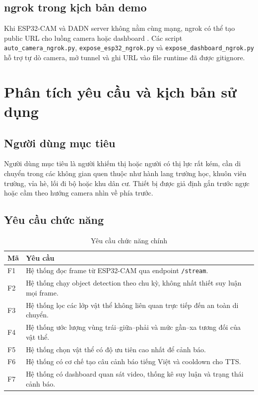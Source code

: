 \documentclass[oneside,final]{hcmut-report}
\begin{document}
\subsection{ngrok trong kịch bản demo}
Khi ESP32-CAM và DADN server không nằm cùng mạng, ngrok có thể tạo public URL cho luồng camera hoặc dashboard \citep{ngrok}. Các script \texttt{auto\_camera\_ngrok.py}, \texttt{expose\_esp32\_ngrok.py} và \texttt{expose\_dashboard\_ngrok.py} hỗ trợ tự dò camera, mở tunnel và ghi URL vào file runtime đã được gitignore.

\section{Phân tích yêu cầu và kịch bản sử dụng}

\subsection{Người dùng mục tiêu}
Người dùng mục tiêu là người khiếm thị hoặc người có thị lực rất kém, cần di chuyển trong các không gian quen thuộc như hành lang trường học, khuôn viên trường, vỉa hè, lối đi bộ hoặc khu dân cư. Thiết bị được giả định gắn trước ngực hoặc cầm theo hướng camera nhìn về phía trước.

\subsection{Yêu cầu chức năng}
\begin{table}[H]
  \centering
  \caption{Yêu cầu chức năng chính}
  \label{tab:functional-requirements}
  \begin{tabularx}{\textwidth}{L{1.8cm}Y}
    \toprule
    \textbf{Mã} & \textbf{Yêu cầu} \\
    \midrule
    F1 & Hệ thống đọc frame từ ESP32-CAM qua endpoint \texttt{/stream}. \\
    F2 & Hệ thống chạy object detection theo chu kỳ, không nhất thiết suy luận mọi frame. \\
    F3 & Hệ thống lọc các lớp vật thể không liên quan trực tiếp đến an toàn di chuyển. \\
    F4 & Hệ thống ước lượng vùng trái--giữa--phải và mức gần--xa tương đối của vật thể. \\
    F5 & Hệ thống chọn vật thể có độ ưu tiên cao nhất để cảnh báo. \\
    F6 & Hệ thống có cơ chế tạo câu cảnh báo tiếng Việt và cooldown cho TTS. \\
    F7 & Hệ thống có dashboard quan sát video, thống kê suy luận và trạng thái cảnh báo. \\
    \bottomrule
  \end{tabularx}
\end{table}
\end{document}

